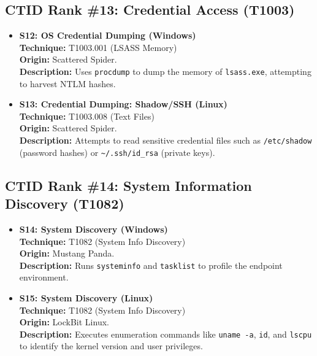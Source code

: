 \subsection{CTID Rank \#13: Credential Access (T1003)}
\begin{itemize}
    \item \textbf{S12: OS Credential Dumping (Windows)} \\
    \textbf{Technique:} T1003.001 (LSASS Memory) \\
    \textbf{Origin:} Scattered Spider. \\
    \textbf{Description:} Uses \texttt{procdump} to dump the memory of \texttt{lsass.exe}, attempting to harvest NTLM hashes.

    \item \textbf{S13: Credential Dumping: Shadow/SSH (Linux)} \\
    \textbf{Technique:} T1003.008 (Text Files) \\
    \textbf{Origin:} Scattered Spider. \\
    \textbf{Description:} Attempts to read sensitive credential files such as \texttt{/etc/shadow} (password hashes) or \texttt{\textasciitilde/.ssh/id\_rsa} (private keys).
\end{itemize}

\subsection{CTID Rank \#14: System Information Discovery (T1082)}
\begin{itemize}
    \item \textbf{S14: System Discovery (Windows)} \\
    \textbf{Technique:} T1082 (System Info Discovery) \\
    \textbf{Origin:} Mustang Panda. \\
    \textbf{Description:} Runs \texttt{systeminfo} and \texttt{tasklist} to profile the endpoint environment.

    \item \textbf{S15: System Discovery (Linux)} \\
    \textbf{Technique:} T1082 (System Info Discovery) \\
    \textbf{Origin:} LockBit Linux. \\
    \textbf{Description:} Executes enumeration commands like \texttt{uname -a}, \texttt{id}, and \texttt{lscpu} to identify the kernel version and user privileges.
\end{itemize}

